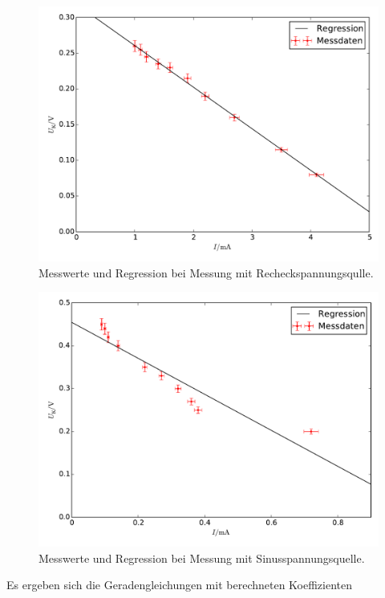 \begin{figure}[h]
	\centering
	\label{fig:Recht}
	\includegraphics[width=\textwidth]{content/plot_Recht.pdf}
	\caption{Messwerte und Regression bei Messung mit Recheckspannungsqulle.}
\end{figure}
\begin{figure}[h]
	\centering
	\label{fig:Sin}
	\includegraphics[width=\textwidth]{content/plot_Sin.pdf}
	\caption{Messwerte und Regression bei Messung mit Sinusspannungsquelle.}
\end{figure}

Es ergeben sich die Geradengleichungen mit berechneten Koeffizienten

